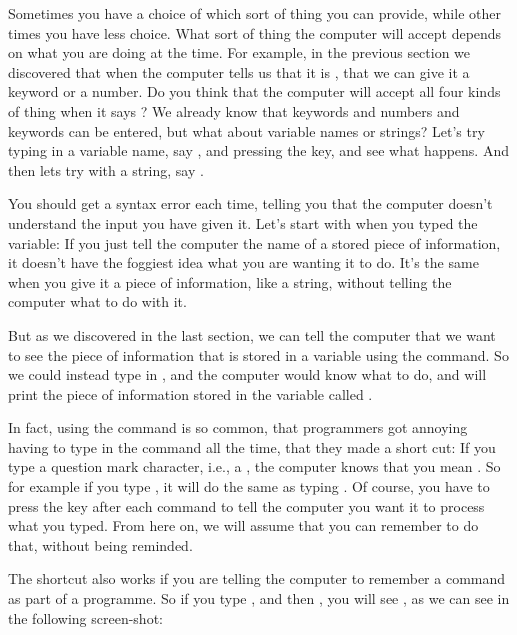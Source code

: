\needspace{4cm} %
Sometimes you have a choice of which sort of thing you can provide, while other times you have less choice. What
sort of thing the computer will accept depends on what you are doing at the time.  For example, in the previous
section we discovered that when the computer tells us that it is , that we can give it
a keyword or a number.  Do you think that the computer will accept all four kinds of thing when it says
?  We already know that keywords and numbers and keywords can be entered, but what about
variable names or strings?  Let's try typing in a variable name, say , and pressing the  key,
and see what happens.  And then lets try with a string, say .


You should get a syntax error each time, telling you that the computer doesn't understand the input you have given it.
Let's start with when you typed the variable: If you just tell the computer the name of a stored piece of information,
it doesn't have the foggiest idea what you are wanting it to do.  It's the same when you give it a piece of information,
like a string, without telling the computer what to do with it.

But as we discovered in the last section, we can tell the computer that we want to see the piece of information that is
stored in a variable using the  command.  So we could instead type in , and
the computer would know what to do, and will print the piece of information stored in the variable called .

In fact, using the  command is so common, that programmers got annoying having to type in the 
command all the time, that they made a short cut: If you type a question mark character, i.e., a , the computer
knows that you mean .  So for example if you type , it will do the same as typing
.  Of course, you have to press the  key after each command to tell the computer
you want it to process what you typed.  From here on, we will assume that you can remember to do that, without being reminded.

\needspace{4cm} %
The  shortcut also works if you are telling the computer to remember a command as part of a programme.
So if you type , and then , you will see , as we can see
in the following screen-shot:

